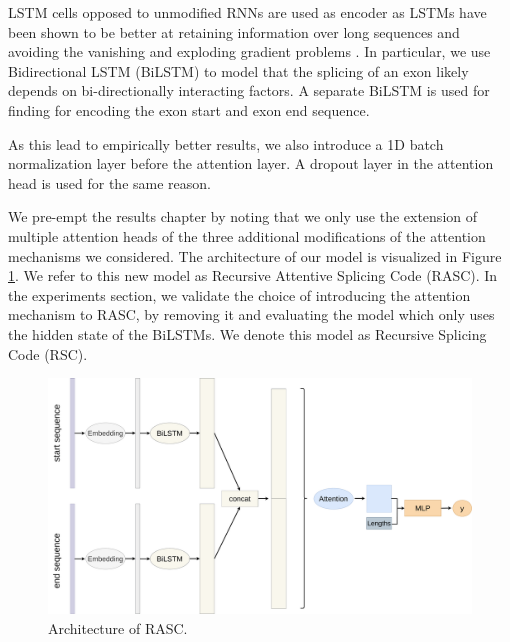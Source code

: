 LSTM cells opposed to unmodified RNNs are used as encoder as LSTMs have been shown to be better at retaining information over long sequences and avoiding the vanishing and exploding gradient problems \cite{lstm}. In particular, we use Bidirectional LSTM (BiLSTM) \cite{bidirection} to model that the splicing of an exon likely depends on bi-directionally interacting factors. A separate BiLSTM is used for finding for encoding the exon start and exon end sequence. 

As this lead to empirically better results, we also introduce a 1D batch normalization layer \cite{batchnormalization} before the attention layer. A dropout layer in the attention head is used for the same reason. 

We pre-empt the results chapter by noting that we only use the extension of multiple attention heads of the three additional modifications of the attention mechanisms we considered. 
The architecture of our model is visualized in Figure \ref{fig:attnbilstm}. We refer to this new model as Recursive Attentive Splicing Code (RASC). In the experiments section, we validate the choice of introducing the attention mechanism to RASC, by removing it and evaluating the model which only uses the hidden state of the BiLSTMs. We denote this model as Recursive Splicing Code (RSC).
\begin{figure}
	\centering\includegraphics[width=1\textwidth]{../visualizations/ch4-methods/visualizations-AttnBiLSTM.pdf} 
	\caption{Architecture of RASC. }
	\label{fig:attnbilstm}
\end{figure}


